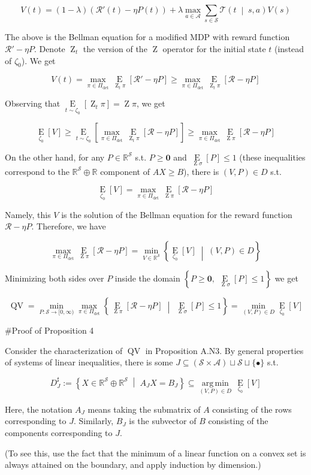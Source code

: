 \documentclass[a4paper]{article}
\newcommand{\AP}[1]{\left(#1\right)}
\newcommand{\AB}[1]{\left[#1\right]}
\newcommand{\AC}[1]{\left\{#1\right\}}
\newcommand{\APM}[2]{\left(#1\;\middle\vert\;#2\right)}
\newcommand{\ACM}[2]{\left\{#1\;\middle\vert\;#2\right\}}
\newcommand{\Ea}[2]{\underset{#1}{\operatorname{E}}\AB{#2}}
\newcommand{\Argmin}[1]{\underset{#1}{\operatorname{arg\,min}}\,}
\newcommand{\Reals}{\mathbb{R}}
\newcommand{\A}{\mathcal{A}}
\newcommand{\St}{\mathcal{S}}
\newcommand{\T}{\mathcal{T}}
\newcommand{\R}{\mathcal{R}}
\newcommand{\Pe}{P}
\newcommand{\QV}{\operatorname{QV}}
\DeclareMathOperator{\Z}{Z}
\begin{document}
$$V(t) = (1-\lambda)\AP{\R'(t)-\eta P(t)} + \lambda \max_{a \in \A } \sum_{s \in \St} \T\APM{t}{s,a} V(s)$$

The above is the Bellman equation for a modified MDP with reward function $\R'-\eta P$. Denote $\Z_t$ the version of the $\Z$ operator for the initial state $t$ (instead of $\zeta_0$). We get

$$V(t) = \max_{\pi\in\Pi_{\det}}{\Ea{\Z_t\pi}{\R'-\eta P}} \geq \max_{\pi\in\Pi_{\det}}{\Ea{\Z_t\pi}{\R-\eta P}}$$

Observing that $\Ea{t\sim\zeta_0}{\Z_t\pi} = \Z\pi$, we get

$$\Ea{\zeta_0}{V} \geq \Ea{t\sim\zeta_0}{\max_{\pi\in\Pi_{\det}}{\Ea{\Z_t\pi}{\R-\eta P}}} \geq \max_{\pi\in\Pi_{\det}} \Ea{\Z\pi}{\R - \eta P}$$

On the other hand, for any $P\in\Reals^\St$ s.t. $P\geq\boldsymbol{0}$ and $\Ea{\Z\sigma}{P} \leq 1$ (these inequalities correspond to the $\Reals^\St\oplus\Reals$ component of $AX \geq B$), there is $(V,P)\in D$ s.t.

$$\Ea{\zeta_0}{V} = \max_{\pi\in\Pi_{\det}} \Ea{\Z\pi}{\R - \eta P}$$

Namely, this $V$ is the solution of the Bellman equation for the reward function $\R-\eta P$. Therefore, we have

$$\max_{\pi\in\Pi_{\det}} \Ea{\Z\pi}{\R - \eta P} = \min_{V\in\Reals^\St}\ACM{\Ea{\zeta_0}{V}}{(V,P)\in D}$$

Minimizing both sides over $P$ inside the domain $\AC{P\geq\boldsymbol{0},\ \Ea{\Z\sigma}{P} \leq 1}$ we get

$$\QV = \min_{\Pe:\St\rightarrow[0,\infty)}\max_{\pi \in \Pi_{\det}}\ACM{\Ea{\Z\pi}{\R-\eta\Pe}}{\Ea{\Z\sigma}{\Pe}\leq1} = \min_{(V,P) \in D}{\Ea{\zeta_0}{V}}$$

\#Proof of Proposition 4

Consider the characterization of $\QV$ in Proposition A.N3. By general properties of systems of linear inequalities, there is some $J \subseteq (\St \times \A) \sqcup \St \sqcup \{\bullet\}$ s.t.

$$D^\sharp_J := \ACM{X \in \Reals^\St \oplus \Reals^\St}{A_J X = B_J} \subseteq \Argmin{(V,P) \in D}{\Ea{\zeta_0}{V}}$$

Here, the notation $A_J$ means taking the submatrix of $A$ consisting of the rows corresponding to $J$. Similarly, $B_J$ is the subvector of $B$ consisting of the components corresponding to $J$.

(To see this, use the fact that the minimum of a linear function on a convex set is always attained on the boundary, and apply induction by dimension.)
\end{document}
